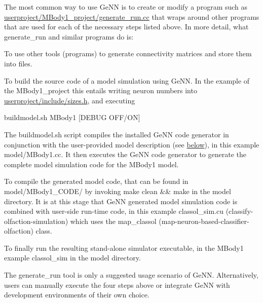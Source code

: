 The most common way to use Ge\+N\+N is to create or modify a program such as {\ttfamily \hyperlink{userproject_2MBody1__project_2generate__run_8cc}{userproject/\+M\+Body1\+\_\+project/generate\+\_\+run.\+cc}} that wraps around other programs that are used for each of the necessary steps listed above. In more detail, what {\ttfamily generate\+\_\+run} and similar programs do is\+:


\begin{DoxyEnumerate}
\item To use other tools (programs) to generate connectivity matrices and store them into files.
\item To build the source code of a model simulation using Ge\+N\+N. In the example of the M\+Body1\+\_\+project this entails writing neuron numbers into {\ttfamily \hyperlink{sizes_8h}{userproject/include/sizes.\+h}}, and executing 
\begin{DoxyCode}
buildmodel.sh MBody1 [DEBUG OFF/ON]
\end{DoxyCode}
 The {\ttfamily buildmodel.\+sh} script compiles the installed Ge\+N\+N code generator in conjunction with the user-\/provided model description (see \hyperlink{Quickstart_ownmodel}{below}), in this example {\ttfamily model/\+M\+Body1.\+cc}. It then executes the Ge\+N\+N code generator to generate the complete model simulation code for the M\+Body1 model.
\item To compile the generated model code, that can be found in {\ttfamily model/\+M\+Body1\+\_\+\+C\+O\+D\+E/} by invoking {\ttfamily make clean \&\& make} in the {\ttfamily model} directory. It is at this stage that Ge\+N\+N generated model simulation code is combined with user-\/side run-\/time code, in this example {\ttfamily classol\+\_\+sim.\+cu} (classify-\/olfaction-\/simulation) which uses the {\ttfamily map\+\_\+classol} (map-\/neuron-\/based-\/classifier-\/olfaction) class.
\item To finally run the resulting stand-\/alone simulator executable, in the M\+Body1 example {\ttfamily classol\+\_\+sim} in the {\ttfamily model} directory.
\end{DoxyEnumerate}

The {\ttfamily generate\+\_\+run} tool is only a suggested usage scenario of Ge\+N\+N. Alternatively, users can manually execute the four steps above or integrate Ge\+N\+N with development environments of their own choice.

